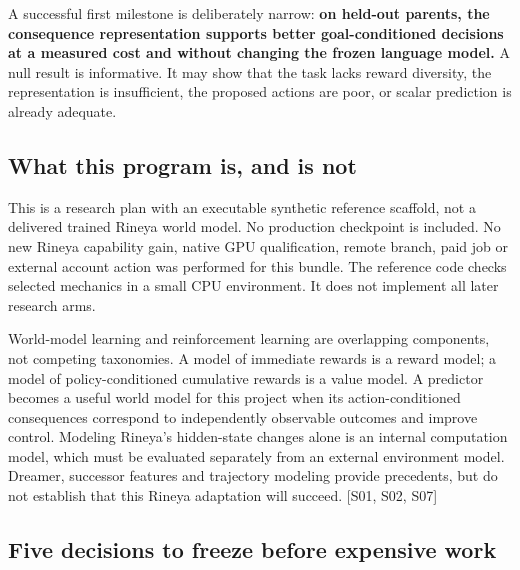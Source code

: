 \documentclass[
  11pt,
  a4paper,
]{article}
\begin{document}
A successful first milestone is deliberately narrow: \textbf{on held-out
parents, the consequence representation supports better goal-conditioned
decisions at a measured cost and without changing the frozen language
model.} A null result is informative. It may show that the task lacks
reward diversity, the representation is insufficient, the proposed
actions are poor, or scalar prediction is already adequate.

\subsection{What this program is, and is
not}\label{what-this-program-is-and-is-not}

This is a research plan with an executable synthetic reference scaffold,
not a delivered trained Rineya world model. No production checkpoint is
included. No new Rineya capability gain, native GPU qualification,
remote branch, paid job or external account action was performed for
this bundle. The reference code checks selected mechanics in a small CPU
environment. It does not implement all later research arms.

World-model learning and reinforcement learning are overlapping
components, not competing taxonomies. A model of immediate rewards is a
reward model; a model of policy-conditioned cumulative rewards is a
value model. A predictor becomes a useful world model for this project
when its action-conditioned consequences correspond to independently
observable outcomes and improve control. Modeling Rineya's hidden-state
changes alone is an internal computation model, which must be evaluated
separately from an external environment model. Dreamer, successor
features and trajectory modeling provide precedents, but do not
establish that this Rineya adaptation will succeed. {[}S01, S02, S07{]}

\subsection{Five decisions to freeze before expensive
work}\label{five-decisions-to-freeze-before-expensive-work}
\end{document}
